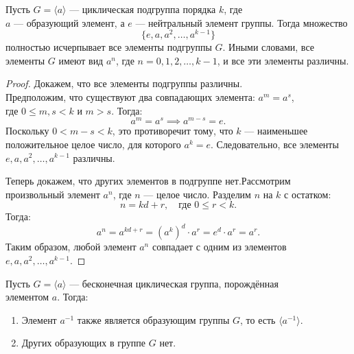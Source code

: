 \begin{shth}
    \begin{theorem}
        Пусть \( G = \langle a \rangle \) — циклическая подгруппа порядка \( k \), где \\\( a \) — образующий элемент, а \( e \) — нейтральный элемент группы. Тогда множество
        \[
        \{ e, a, a^2, \dots, a^{k-1} \}
        \]
        полностью исчерпывает все элементы подгруппы \( G \). Иными словами, все элементы \( G \) имеют вид \( a^n \), где \( n = 0, 1, 2, \dots, k-1 \), и все эти элементы различны.
    \end{theorem}
\end{shth}

\begin{proof}

Докажем, что все элементы подгруппы различны. \\Предположим, что существуют два совпадающих элемента: \( a^m = a^s \), \\где \( 0 \leq m, s < k \) и \( m > s \). Тогда:
\[
a^m = a^s \implies a^{m-s} = e.
\]
Поскольку \( 0 < m - s < k \), это противоречит тому, что \( k \) — наименьшее положительное целое число, для которого \( a^k = e \). Следовательно, все элементы \( e, a, a^2, \dots, a^{k-1} \) различны.

Теперь докажем, что других элементов в подгруппе нет.Рассмотрим произвольный элемент \( a^n \), где \( n \) — целое число. Разделим \( n \) на \( k \) с остатком:
\[
n = kd + r, \quad \text{где } 0 \leq r < k.
\]
Тогда:
\[
a^n = a^{kd + r} = (a^k)^d \cdot a^r = e^d \cdot a^r = a^r.
\]
Таким образом, любой элемент \( a^n \) совпадает с одним из элементов \( e, a, a^2, \dots, a^{k-1} \).
\end{proof}

\begin{shth}
    \begin{theorem}
        Пусть \(G = \langle a \rangle \) — бесконечная циклическая группа, порождённая \\элементом \( a \). Тогда:
        \begin{enumerate}
            \item Элемент \( a^{-1} \) также является образующим группы \( G \), то есть \( \langle a^{-1} \rangle \).
            \item Других образующих в группе \( G \) нет.
        \end{enumerate}
    \end{theorem}
\end{shth}


